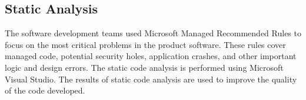 \subsection{Static Analysis}
The software development teams used Microsoft Managed Recommended Rules to focus
on the most critical problems in the product software. These rules cover managed
code, potential security holes, application crashes, and other important logic
and design errors. The static code analysis is performed using Microsoft Visual
Studio. The results of static code analysis are used to improve the quality
of the code developed.
